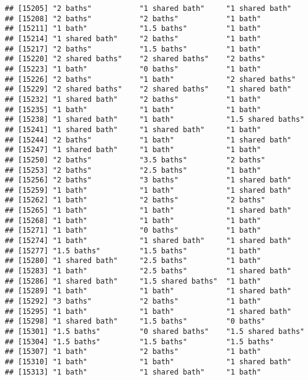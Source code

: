 \documentclass[
]{article}
\begin{document}
\begin{verbatim}
## [15205] "2 baths"           "1 shared bath"     "1 shared bath"    
## [15208] "2 baths"           "2 baths"           "1 bath"           
## [15211] "1 bath"            "1.5 baths"         "1 bath"           
## [15214] "1 shared bath"     "2 baths"           "1 bath"           
## [15217] "2 baths"           "1.5 baths"         "1 bath"           
## [15220] "2 shared baths"    "2 shared baths"    "2 baths"          
## [15223] "1 bath"            "0 baths"           "1 bath"           
## [15226] "2 baths"           "1 bath"            "2 shared baths"   
## [15229] "2 shared baths"    "2 shared baths"    "1 shared bath"    
## [15232] "1 shared bath"     "2 baths"           "1 bath"           
## [15235] "1 bath"            "1 bath"            "1 bath"           
## [15238] "1 shared bath"     "1 bath"            "1.5 shared baths" 
## [15241] "1 shared bath"     "1 shared bath"     "1 bath"           
## [15244] "2 baths"           "1 bath"            "1 shared bath"    
## [15247] "1 shared bath"     "1 bath"            "1 bath"           
## [15250] "2 baths"           "3.5 baths"         "2 baths"          
## [15253] "2 baths"           "2.5 baths"         "1 bath"           
## [15256] "2 baths"           "3 baths"           "1 shared bath"    
## [15259] "1 bath"            "1 bath"            "1 shared bath"    
## [15262] "1 bath"            "2 baths"           "2 baths"          
## [15265] "1 bath"            "1 bath"            "1 shared bath"    
## [15268] "1 bath"            "1 bath"            "1 bath"           
## [15271] "1 bath"            "0 baths"           "1 bath"           
## [15274] "1 bath"            "1 shared bath"     "1 shared bath"    
## [15277] "1.5 baths"         "1.5 baths"         "1 bath"           
## [15280] "1 shared bath"     "2.5 baths"         "1 bath"           
## [15283] "1 bath"            "2.5 baths"         "1 shared bath"    
## [15286] "1 shared bath"     "1.5 shared baths"  "1 bath"           
## [15289] "1 bath"            "1 bath"            "1 shared bath"    
## [15292] "3 baths"           "2 baths"           "1 bath"           
## [15295] "1 bath"            "1 bath"            "1 shared bath"    
## [15298] "1 shared bath"     "1.5 baths"         "0 baths"          
## [15301] "1.5 baths"         "0 shared baths"    "1.5 shared baths" 
## [15304] "1.5 baths"         "1.5 baths"         "1.5 baths"        
## [15307] "1 bath"            "2 baths"           "1 bath"           
## [15310] "1 bath"            "1 bath"            "1 shared bath"    
## [15313] "1 bath"            "1 shared bath"     "1 bath"           

\end{verbatim}
\end{document}
